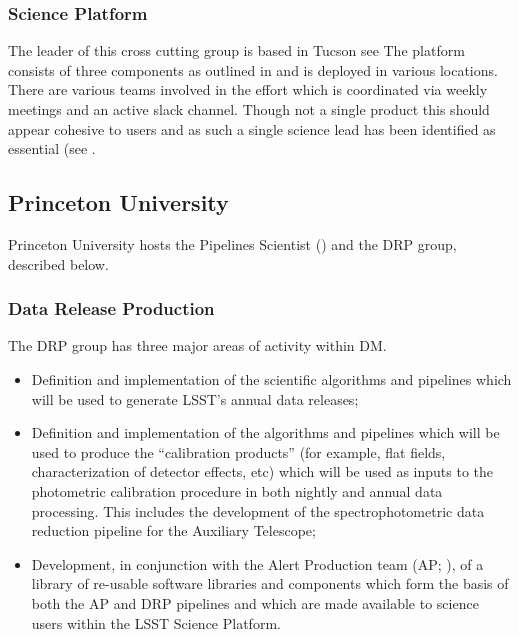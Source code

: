 \subsubsection{Science Platform \label{sec:sciplat}}
The leader of this cross cutting group is based in Tucson see 
The platform consists of three components as outlined in  and is deployed in
various locations. There are various teams involved in the effort which is coordinated via
weekly meetings and an active slack channel. Though not a single product this should appear cohesive to users
and as such a single science lead has been identified as essential (see .

\subsection {Princeton University \label{sect:princeton}}

Princeton University hosts the Pipelines Scientist () and the \gls{DRP} group, described below.

\subsubsection{Data Release Production \label{sect:drp}}

The \gls{DRP} group has three major areas of activity within \gls{DM}.

\begin{itemize}

  \item{Definition and implementation of the scientific algorithms and pipelines which will be used to generate \gls{LSST}'s annual data releases;}

  \item{Definition and implementation of the algorithms and pipelines which will be used to produce the ``calibration products'' (for example, flat fields, characterization of detector effects, etc) which will be used as inputs to the photometric \gls{calibration} procedure in both nightly and annual data processing. This includes the development of the spectrophotometric data reduction \gls{pipeline} for the Auxiliary Telescope;}

  \item{Development, in conjunction with the \gls{Alert Production} team (\gls{AP}; ), of a library of re-usable software libraries and components which form the basis of both the \gls{AP} and \gls{DRP} pipelines and which are made available to science users within the \gls{LSST} \gls{Science Platform}.}

\end{itemize}

